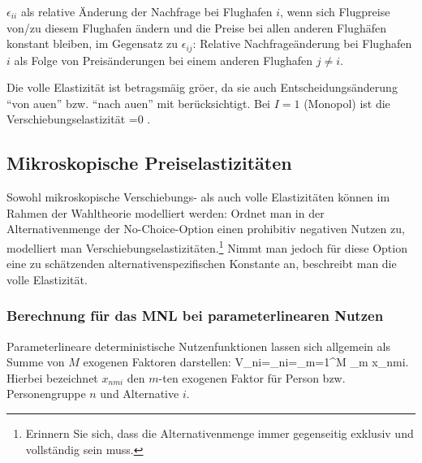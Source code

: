 \item {} $\epsilon_{ii}$ als
  relative \"Anderung der Nachfrage bei Flughafen $i$, wenn sich
  Flugpreise von/zu diesem Flughafen \"andern und die Preise bei allen
  anderen Flugh\"afen 
  konstant bleiben, im Gegensatz zu 
  $\epsilon_{ij}$: Relative Nachfrage\"anderung bei Flughafen $i$ als Folge von
 Preis\"anderungen bei einem anderen Flughafen
  $j\neq i$. 

\eenum

\newpage

\vspace{-1.0em}

\noindent
{\scriptsize Die volle Elastizit\"at ist betragsm\"a\3ig gr\"o\3er, da
  sie auch Entscheidungs\"anderung ``von au\3en'' bzw. ``nach au\3en''
  mit ber\"ucksichtigt. Bei $I=1$ (Monopol) ist die Verschiebungselastizit\"at =0 .}



\subsection{\label{sec:elastMicro}Mikroskopische Preiselastizit\"aten}

Sowohl mikroskopische Verschiebungs- als auch volle Elastizit\"aten
k\"onnen im Rahmen der Wahltheorie modelliert werden: Ordnet 
man in der Alternativenmenge der No-Choice-Option einen prohibitiv
negativen Nutzen zu, modelliert man
Verschiebungselastizit\"aten.\footnote{Erinnern Sie sich, dass die
  Alternativenmenge immer gegenseitig exklusiv und vollst\"andig sein
  muss.}
 Nimmt man jedoch f\"ur diese Option eine zu
sch\"atzenden alternativenspezifischen Konstante an, beschreibt man
die volle Elastizit\"at. 

\subsubsection*{Berechnung f\"ur das MNL bei parameterlinearen Nutzen}
Parameterlineare deterministische Nutzenfunktionen lassen sich
allgemein als Summe von $M$ exogenen Faktoren darstellen:
\be
\label{VlinAllg}
V_{ni}=\vecbeta\tr {}_{ni}=\sum_{m=1}^M \beta_m x_{nmi}.
\ee
Hierbei bezeichnet $x_{nmi}$ den $m$-ten exogenen Faktor f\"ur Person
bzw. Personengruppe $n$ und Alternative $i$.

